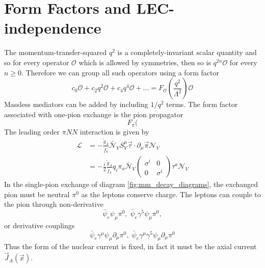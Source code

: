 \documentclass{book}[letterpaper,12pt]
\begin{document}
\section{Form Factors and LEC-independence}
\label{sec:form_factors}
The momentum-transfer-squared $q^2$ is a completely-invariant scalar quantity and so for every operator $\mathcal{O}$ which is allowed by symmetries, then so is $q^{2n}\mathcal{O}$ for every $n\geq 0$. Therefore we can group all such operators using a form factor
\begin{equation}
c_0\mathcal{O}+c_2 q^2\mathcal{O}+c_4q^4\mathcal{O}+...=F_{\mathcal{O}}\left(\frac{q^2}{\Lambda^2}\right)\mathcal{O}
\end{equation}
Massless mediators can be added by including $1/q^2$ terms. The form factor associated with one-pion exchange is the pion propagator
\begin{equation}
F_{\pi}(
\end{equation}
The leading order $\pi NN$ interaction is given by
\begin{equation}
\begin{split}
\mathcal{L}&=-\frac{\mathring{g}_A}{\mathring{f}_{\pi}}\bar{\mathcal{N}}_V S^{\mu}_V\vec{\tau}\cdot\partial_{\mu}\vec{\pi}\mathcal{N}_V\\
&=-\frac{i}{2}\frac{\mathring{g}_A}{\mathring{f}_{\pi}}q_i\pi_a\bar{\mathcal{N}}_V\left(\begin{array}{cc}
\sigma^i & 0 \\
0 & \sigma^i
\end{array}\right)\tau^a\mathcal{N}_V
\end{split}
\end{equation}
In the single-pion exchange of diagram \ref{fig:mm_decay_diagrams}, the exchanged pion must be neutral $\pi^0$ as the leptons conserve charge. The leptons can couple to the pion through non-derivative 
\begin{equation}
\bar{\psi}_e\psi_{\mu}\pi^0,\;\bar{\psi}_e\gamma^5\psi_{\mu}\pi^0,
\end{equation}
or derivative couplings
\begin{equation}
\bar{\psi}_e\gamma^{\mu}\psi_{\mu}\partial_{\mu}\pi^0,\;\bar{\psi}_e\gamma^{\mu}\gamma^5\psi_{\mu}\partial_{\mu}\pi^0
\end{equation}
Thus the form of the nuclear current is fixed, in fact it must be the axial current $\vec{J}_A(\vec{x})$.
\end{document}
